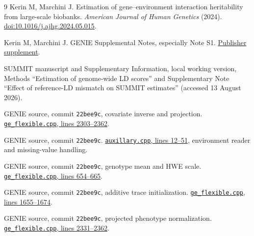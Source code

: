 \documentclass[11pt]{article}
\begin{document}
\begin{thebibliography}{9}
Kerin M, Marchini J. Estimation of gene--environment interaction heritability
from large-scale biobanks. \emph{American Journal of Human Genetics} (2024).
\href{https://doi.org/10.1016/j.ajhg.2024.05.015}{doi:10.1016/j.ajhg.2024.05.015}.

Kerin M, Marchini J. GENIE Supplemental Notes, especially Note S1.
\href{https://ars.els-cdn.com/content/image/1-s2.0-S0002929724001782-mmc1.pdf}{Publisher supplement}.

SUMMIT manuscript and Supplementary Information, local working version,
Methods ``Estimation of genome-wide LD scores'' and Supplementary Note
``Effect of reference-LD mismatch on SUMMIT estimates'' (accessed 13 August
2026).

GENIE source, commit \texttt{22bee9c}, covariate inverse and projection.
\href{https://github.com/sriramlab/GENIE/blob/22bee9cd53d61eabb2ffcec70acf3c5bb43ede01/src/ge_flexible.cpp#L2303-L2362}{\texttt{ge\_flexible.cpp}, lines 2303--2362}.

GENIE source, commit \texttt{22bee9c}.
\href{https://github.com/sriramlab/GENIE/blob/22bee9cd53d61eabb2ffcec70acf3c5bb43ede01/src/auxillary.cpp#L12-L51}{\texttt{auxillary.cpp}, lines 12--51},
environment reader and missing-value handling.

GENIE source, commit \texttt{22bee9c}, genotype mean and HWE scale.
\href{https://github.com/sriramlab/GENIE/blob/22bee9cd53d61eabb2ffcec70acf3c5bb43ede01/src/ge_flexible.cpp#L654-L665}{\texttt{ge\_flexible.cpp}, lines 654--665}.

GENIE source, commit \texttt{22bee9c}, additive trace initialization.
\href{https://github.com/sriramlab/GENIE/blob/22bee9cd53d61eabb2ffcec70acf3c5bb43ede01/src/ge_flexible.cpp#L1655-L1674}{\texttt{ge\_flexible.cpp}, lines 1655--1674}.

GENIE source, commit \texttt{22bee9c}, projected phenotype normalization.
\href{https://github.com/sriramlab/GENIE/blob/22bee9cd53d61eabb2ffcec70acf3c5bb43ede01/src/ge_flexible.cpp#L2331-L2362}{\texttt{ge\_flexible.cpp}, lines 2331--2362}.
\end{thebibliography}
\end{document}
